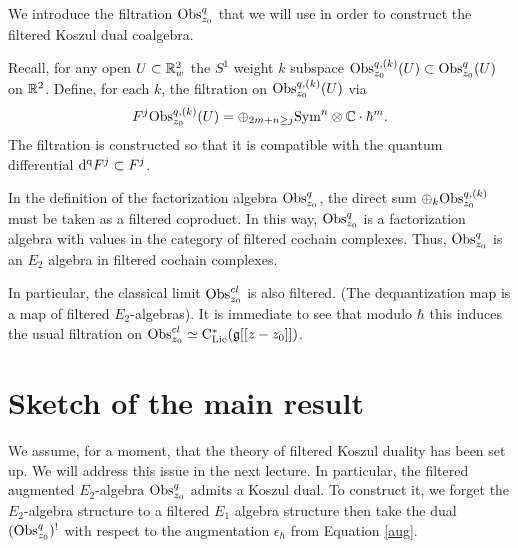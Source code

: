 \documentclass[11pt]{amsart}
\begin{document}
We introduce the filtration ${\rm Obs}^q_{z_0}$ that we will use in order to construct the filtered Koszul dual coalgebra. 



\begin{dfn}
Recall, for any open $U \subset \mathbb R^2_{w}$ the $S^1$ weight $k$ subspace ${\rm Obs}^{q,(k)}_{z_0}(U) \subset {\rm Obs}^{q}_{z_0}(U)$ on $\mathbb R^2$. 
Define, for each $k$, the filtration on ${\rm Obs}^{q,(k)}_{z_0}(U)$ via
\[
F^j {\rm Obs}^{q,(k)}_{z_0} (U) = \oplus_{2m + n \geq j} {\rm Sym}^{n} \otimes \mathbb C \cdot \hbar^m .
\]
The filtration is constructed so that it is compatible with the quantum differential ${\rm d}^{\rm q} F^j \subset F^j$.
\end{dfn}

\begin{rmk} In the definition of the factorization algebra ${\rm Obs}^q_{z_0}$, the direct sum $\oplus_k {\rm Obs}^{q,(k)}_{z_0}$ must be taken as a filtered coproduct. 
In this way, ${\rm Obs}^{q}_{z_0}$ is a factorization algebra with values in the category of filtered cochain complexes. 
Thus, ${\rm Obs}^{q}_{z_0}$ is an $E_2$ algebra in filtered cochain complexes. 
\end{rmk}

In particular, the classical limit ${\rm Obs}^{cl}_{z_0}$ is also filtered. (The dequantization map is a map of filtered $E_2$-algebras). 
It is immediate to see that modulo $\hbar$ this induces the usual filtration on ${\rm Obs}^{cl}_{z_0} \simeq {\rm C}_{{\rm Lie}}^*(\mathfrak g[[z-z_0]])$. 

\section{Sketch of the main result} 

We assume, for a moment, that the theory of filtered Koszul duality has been set up. 
We will address this issue in the next lecture. 
In particular, the filtered augmented $E_2$-algebra ${\rm Obs}^q_{z_0}$ admits a Koszul dual. 
To construct it, we forget the $E_2$-algebra structure to a filtered $E_1$ algebra structure then take the dual $({\rm Obs}^q_{z_0})^{!}$ with respect to the augmentation $\epsilon_{\hbar}$ from Equation \ref{aug}. 
\end{document}
